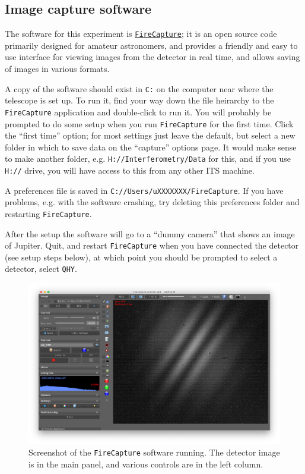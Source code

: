 \documentclass[11pt]{article}
\begin{document}
\subsection{Image capture software}\label{sec:software}

The software for this experiment is \href{http://www.firecapture.de/}{\texttt{FireCapture}}; it is an open source code primarily designed for amateur astronomers, and provides a friendly and easy to use interface for viewing images from the detector in real time, and allows saving of images in various formats.

A copy of the software should exist in \texttt{C:} on the computer near where the telescope is set up. To run it, find your way down the file heirarchy to the \texttt{FireCapture} application and double-click to run it. You will probably be prompted to do some setup when you run \texttt{FireCapture} for the first time. Click the ``first time'' option; for most settings just leave the default, but select a new folder in which to save data on the ``capture'' options page. It would make sense to make another folder, e.g. \texttt{H://Interferometry/Data} for this, and if you use \texttt{H://} drive, you will have access to this from any other ITS machine.

A preferences file is saved in \texttt{C://Users/uXXXXXXX/FireCapture}. If you have problems, e.g. with the software crashing, try deleting this preferences folder and restarting \texttt{FireCapture}.

After the setup the software will go to a ``dummy camera'' that shows an image of Jupiter. Quit, and restart \texttt{FireCapture} when you have connected the detector (see setup steps below), at which point you should be prompted to select a detector, select \texttt{QHY}.

\begin{figure}[h]
    \centering
    \includegraphics[width=1\textwidth]{doc/fc.png}
    \caption{Screenshot of the \texttt{FireCapture} software running. The detector image is in the main panel, and various controls are in the left column.}
    \label{fig:fc}
\end{figure}
\end{document}
